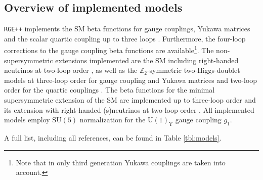 \documentclass[preprint,12pt]{elsarticle}
\begin{document}
\subsection{\label{sec::overview}Overview of implemented models}
\texttt{RGE++} implements the SM beta functions for gauge couplings, Yukawa matrices and the scalar quartic coupling up to three loops \cite{Machacek:1983tz,Machacek:1983fi,Machacek:1984zw,
                               Mihaila:2012fm,Mihaila:2012pz,Bednyakov:2012rb,Chetyrkin:2012rz,Bednyakov:2012en,Bednyakov:2014pia,Herren:2017uxn,Chetyrkin:2013wya,Bednyakov:2013eba,Bednyakov:2013cpa}.
Furthermore, the four-loop corrections to the gauge coupling beta functions \cite{Davies:2019onf} are available\footnote{Note that in \cite{Davies:2019onf} only third generation Yukawa couplings are taken into account.}.
The non-supersymmetric extensions implemented are the SM including right-handed neutrinos at two-loop order \cite{Machacek:1983tz,Machacek:1983fi,Machacek:1984zw, Antusch:2005gp, Grzadkowski:1987tf}, as well as
the $\mathbb{Z}_2$-symmetric two-Higgs-doublet models at three-loop order for gauge coupling and Yukawa matrices and two-loop order for the quartic couplings
\cite{Machacek:1983tz,Machacek:1983fi,Machacek:1984zw, Herren:2017uxn, Chowdhury:2015yja}.
The beta functions for the minimal supersymmetric extension of the SM are implemented up to three-loop order \cite{Martin:1993zk,Ferreira:1996ug} and its extension with right-handed (s)neutrinos at two-loop order
\cite{Martin:1993zk,Antusch:2005gp,Grzadkowski:1987wr}. All implemented models employ $\mathrm{SU}(5)$ normalization for the $\mathrm{U}(1)_\mathrm{Y}$ gauge coupling $g_1$.

A full list, including all references, can be found in Table \ref{tbl:models}.
\end{document}
